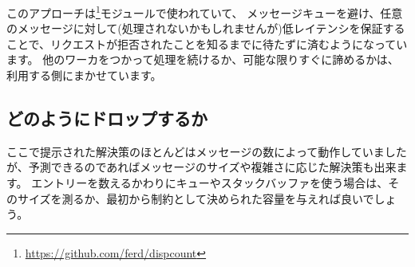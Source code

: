 このアプローチは\footnote{\href{https://github.com/ferd/dispcount}{https://github.com/ferd/dispcount}}モジュールで使われていて、
メッセージキューを避け、任意のメッセージに対して(処理されないかもしれませんが)低レイテンシを保証することで、リクエストが拒否されたことを知るまでに待たずに済むようになっています。
他のワーカをつかって処理を続けるか、可能な限りすぐに諦めるかは、利用する側にまかせています。

\subsection{どのようにドロップするか}

ここで提示された解決策のほとんどはメッセージの数によって動作していましたが、予測できるのであればメッセージのサイズや複雑さに応じた解決策も出来ます。
エントリーを数えるかわりにキューやスタックバッファを使う場合は、そのサイズを測るか、最初から制約として決められた容量を与えれば良いでしょう。


